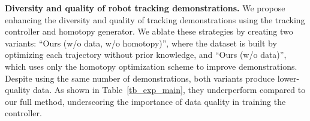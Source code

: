 \noindent\textbf{Diversity and quality of robot tracking demonstrations.} 
We propose enhancing the diversity and quality of tracking demonstrations using the tracking controller and homotopy generator. We ablate these strategies by creating two variants: ``Ours (w/o data, w/o homotopy)'', where the dataset is built by optimizing each trajectory without prior knowledge, and ``Ours (w/o data)'', which uses only the homotopy optimization scheme to improve demonstrations. Despite using the same number of demonstrations, both variants produce lower-quality data. As shown in Table~\ref{tb_exp_main}, they underperform compared to our full method, underscoring the importance of data quality in training the controller.
% 
